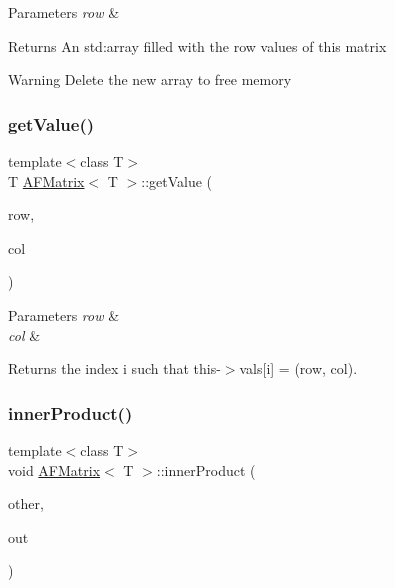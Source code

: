 \begin{DoxyParams}{Parameters}
{\em row} & \\
\hline
\end{DoxyParams}
\begin{DoxyReturn}{Returns}
An {\ttfamily std\+:array} filled with the row values of this matrix 
\end{DoxyReturn}
\begin{DoxyWarning}{Warning}
Delete the new array to free memory 
\end{DoxyWarning}
\mbox{\label{classAFMatrix_a42f6c9d02b5507b39bf8899fea730cbf}} 
\subsubsection{\texorpdfstring{get\+Value()}{getValue()}}
{\footnotesize\ttfamily template$<$class T$>$ \\
T \hyperlink{classAFMatrix}{A\+F\+Matrix}$<$ T $>$\+::get\+Value (\begin{DoxyParamCaption}\item[{int}]{row,  }\item[{int}]{col }\end{DoxyParamCaption})\hspace{0.3cm}{\ttfamily [inline]}}


\begin{DoxyParams}{Parameters}
{\em row} & \\
\hline
{\em col} & \\
\hline
\end{DoxyParams}
\begin{DoxyReturn}{Returns}
the index {\ttfamily i} such that {\ttfamily this-\/$>$vals\mbox{[}i\mbox{]} = (row, col)}. 
\end{DoxyReturn}
\mbox{\label{classAFMatrix_a2c4d9cfe683f893fd961904a788f952a}} 
\subsubsection{\texorpdfstring{inner\+Product()}{innerProduct()}\hspace{0.1cm}{\footnotesize\ttfamily [1/4]}}
{\footnotesize\ttfamily template$<$class T$>$ \\
void \hyperlink{classAFMatrix}{A\+F\+Matrix}$<$ T $>$\+::inner\+Product (\begin{DoxyParamCaption}\item[{\hyperlink{classAFMatrix}{A\+F\+Matrix}$<$ T $>$ $\ast$}]{other,  }\item[{\hyperlink{classAFMatrix}{A\+F\+Matrix}$<$ T $>$ $\ast$}]{out }\end{DoxyParamCaption})\hspace{0.3cm}{\ttfamily [inline]}}


